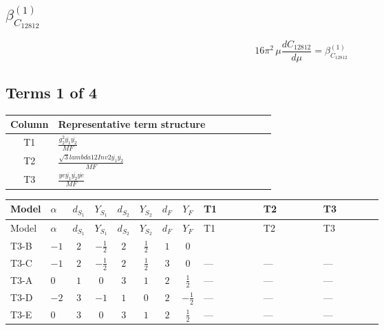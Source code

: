 \documentclass[8pt]{article}
\begin{document}
\begin{landscape}
\section*{$\beta_{C_{12812}}^{(1)}$}
\[16\pi^2\,\mu\frac{d C_{12812}}{d\mu}=\beta_{C_{12812}}^{(1)}\]
\subsection*{Terms 1 of 4}
\begin{center}
\begin{tabular}{@{}c >{\raggedright\arraybackslash}p{0.82\linewidth}@{}}
\toprule
Column & Representative term structure \\
\midrule
T1 & \(\displaystyle \frac{g_{2}^{2} \overline{y_{1}} \overline{y_{2}}}{MF}\) \\
\midrule
T2 & \(\displaystyle \frac{\sqrt{3} lambda12Inv2 \overline{y_{1}} \overline{y_{2}}}{MF}\) \\
\midrule
T3 & \(\displaystyle \frac{ye \overline{y_{1}} \overline{y_{2}} \overline{ye}}{MF}\) \\
\midrule
\bottomrule
\end{tabular}
\end{center}
\smallskip
\tiny
\begin{longtable}{@{}llcccccc >{\raggedright\arraybackslash}p{0.21\linewidth} >{\raggedright\arraybackslash}p{0.21\linewidth} >{\raggedright\arraybackslash}p{0.21\linewidth}@{}}
\toprule
Model & $\alpha$ & $d_{S_1}$ & $Y_{S_1}$ & $d_{S_2}$ & $Y_{S_2}$ & $d_F$ & $Y_F$ & T1 & T2 & T3 \\
\midrule
\endfirsthead
\toprule
Model & $\alpha$ & $d_{S_1}$ & $Y_{S_1}$ & $d_{S_2}$ & $Y_{S_2}$ & $d_F$ & $Y_F$ & T1 & T2 & T3 \\
\midrule
\endhead
T3-B & $-1$ & $2$ & $-\frac{1}{2}$ & $2$ & $\frac{1}{2}$ & $1$ & $0$ & \scriptsize\adjustbox{max width=\linewidth}{$\begin{gathered} - \frac{3 g_{2}^{2} \overline{y_{1}} \overline{y_{2}}}{8 MF}\end{gathered}$} & \scriptsize\adjustbox{max width=\linewidth}{$\begin{gathered} - \frac{\sqrt{3} lambda12Inv2 \overline{y_{1}} \overline{y_{2}}}{6 MF}\end{gathered}$} & \scriptsize\adjustbox{max width=\linewidth}{$\begin{gathered} \frac{ye \overline{y_{1}} \overline{y_{2}} \overline{ye}}{8 MF}\end{gathered}$} \\
\midrule
T3-C & $-1$ & $2$ & $-\frac{1}{2}$ & $2$ & $\frac{1}{2}$ & $3$ & $0$ & --- & --- & --- \\
\midrule
T3-A & $0$ & $1$ & $0$ & $3$ & $1$ & $2$ & $\frac{1}{2}$ & --- & --- & --- \\
\midrule
T3-D & $-2$ & $3$ & $-1$ & $1$ & $0$ & $2$ & $-\frac{1}{2}$ & --- & --- & --- \\
\midrule
T3-E & $0$ & $3$ & $0$ & $3$ & $1$ & $2$ & $\frac{1}{2}$ & --- & --- & --- \\
\midrule
\bottomrule
\end{longtable}
\clearpage

\end{landscape}
\end{document}

